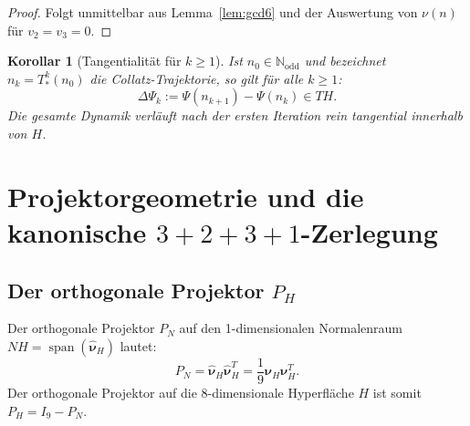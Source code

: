 \documentclass[11pt,a4paper]{article}
\theoremstyle{plain}
\newtheorem{corollary}[theorem]{Korollar}
\theoremstyle{definition}
\newcommand{\N}{\mathbb{N}}
\begin{document}
\begin{proof}
Folgt unmittelbar aus Lemma~\ref{lem:gcd6} und der Auswertung von $\nu(n)$ für $v_2 = v_3 = 0$.
\end{proof}

\begin{corollary}[Tangentialität für $k \ge 1$]
Ist $n_0 \in \N_{\mathrm{odd}}$ und bezeichnet $n_k = T_*^k(n_0)$ die Collatz-Trajektorie, so gilt für alle $k \ge 1$:
\begin{equation}
    \Delta\Psi_k := \Psi(n_{k+1}) - \Psi(n_k) \in TH.
\end{equation}
Die gesamte Dynamik verläuft nach der ersten Iteration rein tangential innerhalb von $H$.
\end{corollary}

\section{Projektorgeometrie und die kanonische \texorpdfstring{$3+2+3+1$}{3+2+3+1}-Zerlegung}

\subsection{Der orthogonale Projektor \texorpdfstring{$P_H$}{PH}}

Der orthogonale Projektor $P_N$ auf den 1-dimensionalen Normalenraum $NH = \operatorname{span}(\widehat{\boldsymbol{\nu}}_H)$ lautet:
\begin{equation}
    P_N = \widehat{\boldsymbol{\nu}}_H \widehat{\boldsymbol{\nu}}_H^T = \frac{1}{9} \boldsymbol{\nu}_H \boldsymbol{\nu}_H^T.
\end{equation}
Der orthogonale Projektor auf die 8-dimensionale Hyperfläche $H$ ist somit $P_H = I_9 - P_N$.
\end{document}

